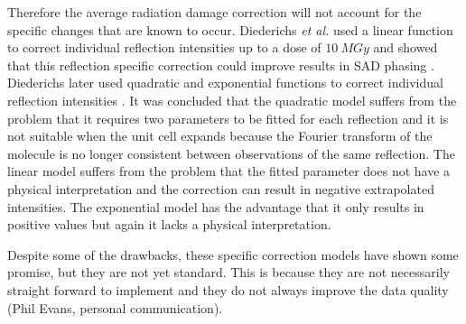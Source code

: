 		Therefore the average radiation damage correction will not account for the specific changes that are known to occur.
		Diederichs \textit{et al.} used a linear function to correct individual reflection intensities up to a dose of $10\ MGy$ and showed that this reflection specific correction could improve results in SAD phasing \cite{diederichs2003}.
		Diederichs later used quadratic and exponential functions to correct individual reflection intensities \cite{diederichs2006}.
		It was concluded that the quadratic model suffers from the problem that it requires two parameters to be fitted for each reflection and it is not suitable when the unit cell expands because the Fourier transform of the molecule is no longer consistent between observations of the same reflection.
		The linear model suffers from the problem that the fitted parameter does not have a physical interpretation and the correction can result in negative extrapolated intensities.
		The exponential model has the advantage that it only results in positive values but again it lacks a physical interpretation.

		Despite some of the drawbacks, these specific correction models have shown some promise, but they are not yet standard. This is because they are not necessarily straight forward to implement and they do not always improve the data quality (Phil Evans, personal communication).
